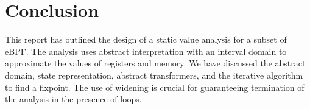 \section{Conclusion}
This report has outlined the design of a static value analysis for a subset of eBPF. The analysis uses abstract interpretation with an interval domain to approximate the values of registers and memory. We have discussed the abstract domain, state representation, abstract transformers, and the iterative algorithm to find a fixpoint. The use of widening is crucial for guaranteeing termination of the analysis in the presence of loops.
